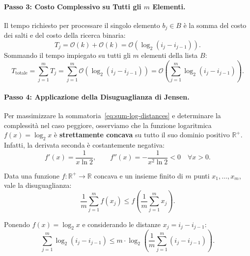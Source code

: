 \paragraph{Passo 3: Costo Complessivo su Tutti gli $m$ Elementi.}
Il tempo richiesto per processare il singolo elemento $b_j \in B$ è la somma del costo dei salti e del costo della ricerca binaria:
\begin{equation}
  T_j = \mathcal{O}(k) + \mathcal{O}(k) = \mathcal{O}(\log_2(i_j - i_{j-1})).
\end{equation}
Sommando il tempo impiegato su tutti gli $m$ elementi della lista $B$:
\begin{equation}
  T_{\text{totale}} = \sum_{j=1}^m T_j = \sum_{j=1}^m \mathcal{O}(\log_2(i_j - i_{j-1})) = \mathcal{O}\left(\sum_{j=1}^m \log_2(i_j - i_{j-1})\right).
  \label{eq:sum-log-distances}
\end{equation}

\paragraph{Passo 4: Applicazione della Disuguaglianza di Jensen.}
Per massimizzare la sommatoria~\eqref{eq:sum-log-distances} e determinare la complessità nel caso peggiore, osserviamo che la funzione logaritmica $f(x) = \log_2 x$ è \textbf{strettamente concava} su tutto il suo dominio positivo $\mathbb{R}^+$. Infatti, la derivata seconda è costantemente negativa:
\begin{equation}
  f'(x) = \frac{1}{x \ln 2}, \qquad f''(x) = -\frac{1}{x^2 \ln 2} < 0 \quad \forall x > 0.
\end{equation}

\begin{theorem}
Data una funzione $f: \mathbb{R}^+ \to \mathbb{R}$ concava e un insieme finito di $m$ punti $x_1, \dots, x_m$, vale la disuguaglianza:
\begin{equation}
  \frac{1}{m} \sum_{j=1}^m f(x_j) \le f\left(\frac{1}{m} \sum_{j=1}^m x_j\right).
\end{equation}
\end{theorem}

Ponendo $f(x) = \log_2 x$ e considerando le distanze $x_j = i_j - i_{j-1}$:
\begin{equation}
  \sum_{j=1}^m \log_2(i_j - i_{j-1}) \le m \cdot \log_2\left(\frac{1}{m} \sum_{j=1}^m (i_j - i_{j-1})\right).
  \label{eq:jensen-application}
\end{equation}

